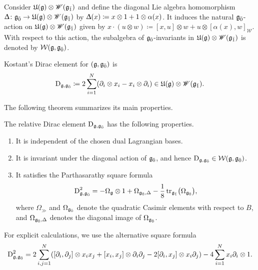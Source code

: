 Consider ${\mathfrak U}({\mathfrak{g}})\otimes\mathscr W({\mathfrak{g}_{\bar{1}}})$ and define the diagonal Lie algebra homomorphism $\Updelta\colon{\mathfrak{g}_{\bar{0}}}\to{\mathfrak U}({\mathfrak{g}})\otimes\mathscr W({\mathfrak{g}_{\bar{1}}})$ by $\Updelta(x)\coloneqq x\otimes1+1\otimes\alpha(x)$. It induces the natural ${\mathfrak{g}_{\bar{0}}}$-action on ${\mathfrak U}({\mathfrak{g}})\otimes\mathscr W({\mathfrak{g}_{\bar{1}}})$ given by $x\cdot(u\otimes w)\coloneqq [x,u]\otimes w+u\otimes[\alpha(x),w]_{\mathscr W}$. With respect to this action, the subalgebra of ${\mathfrak{g}_{\bar{0}}}$-invariants in ${\mathfrak U}({\mathfrak{g}})\otimes\mathscr W({\mathfrak{g}_{\bar{1}}})$ is denoted by $\mathcal W({\mathfrak{g}},{\mathfrak{g}_{\bar{0}}})$.

 \begin{definition}\label{def::Dirac}
Kostant's Dirac element for $({\mathfrak{g}},{\mathfrak{g}_{\bar{0}}})$ is 
\[
\operatorname{D}_{{\mathfrak{g}},{\mathfrak{g}_{\bar{0}}}} \coloneqq 2 \sum_{i=1}^{N}(\partial_{i}\otimes x_{i}-x_{i}\otimes \partial_{i}) \in {\mathfrak U}({\mathfrak{g}})\otimes \mathscr{W}({\mathfrak{g}_{\bar{1}}}).
\]
 \end{definition}

 The following theorem summarizes its main properties.

\begin{theorem}\label{thm::properties_D}
 The relative Dirac element $\operatorname{D}_{{\mathfrak{g}},{\mathfrak{g}_{\bar{0}}}}$ has the following properties.
 \begin{enumerate}
 \item[(a)] It is independent of the chosen dual Lagrangian bases.
 \item[(b)] It is invariant under the diagonal action of ${\mathfrak{g}_{\bar{0}}}$, and hence
 $\operatorname{D}_{{\mathfrak{g}},{\mathfrak{g}_{\bar{0}}}}\in\mathcal W({\mathfrak{g}},{\mathfrak{g}_{\bar{0}}})$.
 \item[(c)] It satisfies the Parthasarathy square formula
 \begin{equation*}
 \operatorname{D}_{{\mathfrak{g}},{\mathfrak{g}_{\bar{0}}}}^{2}
 =
 -\Omega_{{\mathfrak{g}}}\otimes1
 +\Omega_{{\mathfrak{g}_{\bar{0}}},\Delta}
 -\frac18\operatorname{tr}_{{\mathfrak{g}_{\bar{1}}}}
 \bigl(\Omega_{{\mathfrak{g}_{\bar{0}}}}\bigr),
 \end{equation*}
 where $\Omega_{\gg}$ and $\Omega_{{\mathfrak{g}_{\bar{0}}}}$ denote the quadratic Casimir
 elements with respect to $B$, and $\Omega_{{\mathfrak{g}_{\bar{0}}},\Delta}$ denotes the
 diagonal image of $\Omega_{{\mathfrak{g}_{\bar{0}}}}$.
 \end{enumerate}
\end{theorem}

 \begin{remark} \label{rmk::Explicit_form_D_square}
For explicit calculations, we use the alternative square formula
\begin{equation*}
\operatorname{D}^{2}_{{\mathfrak{g}},{\mathfrak{g}_{\bar{0}}}} = 2 \sum_{i,j = 1}^{N} ([\partial_{i},\partial_{j}] \otimes x_{i}x_{j} + [x_{i},x_{j}] \otimes \partial_{i}\partial_{j} - 2[\partial_{i},x_{j}]\otimes x_{i}\partial_{j}) - 4 \sum_{i=1}^{N}x_{i}\partial_{i}\otimes 1.
\end{equation*}
\end{remark}

